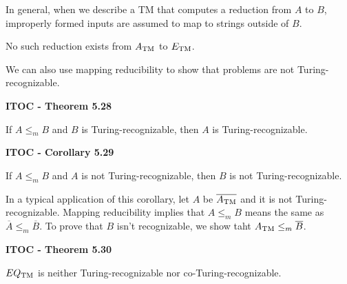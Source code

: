 In general, when we describe a TM that computes a reduction from $A$ to $B$, improperly formed inputs are assumed to map to strings outside of $B$.

No such reduction exists from $A_{\text{TM}}$ to $E_{\text{TM}}$.

We can also use mapping reducibility to show that problems are not Turing-recognizable.

\begin{shaded}
\textbf{ITOC - Theorem 5.28}

\medskip
If $A \leq_m B$ and $B$ is Turing-recognizable, then $A$ is Turing-recognizable.
\end{shaded}

\begin{shaded}
\textbf{ITOC - Corollary 5.29}

\medskip
If $A \leq_m B$ and $A$ is not Turing-recognizable, then $B$ is not Turing-recognizable.
\end{shaded}

In a typical application of this corollary, let $A$ be $\overline{A_{\text{TM}}}$ and it is not Turing-recognizable. Mapping reducibility implies that $A \leq_m B$ means the same as $\overline{A} \leq_m \overline{B}$. To prove that $B$ isn't recognizable, we show taht $A_{\text{TM}} \leq_m \overline{B}$.


\label{lang:EQTM_NTR}
\label{lang:EQTMC_NTR}
\begin{shaded}
\textbf{ITOC - Theorem 5.30}

\medskip
$EQ_{\text{TM}}$ is neither Turing-recognizable nor co-Turing-recognizable.
\end{shaded}

